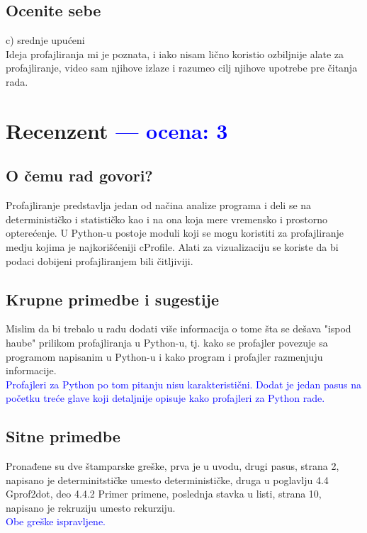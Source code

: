 \documentclass[a4paper]{report}
\newcommand{\odgovor}[1]{\textcolor{blue}{#1}}
\begin{document}
\section{Ocenite sebe}
c) srednje upućeni
\\
Ideja profajliranja mi je poznata, i iako nisam lično koristio ozbiljnije alate za profajliranje, video sam njihove izlaze i razumeo cilj njihove upotrebe pre čitanja rada.

\chapter{Recenzent \odgovor{--- ocena: 3} }


\section{O čemu rad govori?}
Profajliranje predstavlja jedan od načina analize programa i deli se na determinističko i statističko kao i na ona koja mere vremensko i prostorno opterećenje. U Python-u postoje moduli koji se mogu koristiti za profajliranje medju kojima je najkorišćeniji cProfile. Alati za vizualizaciju se koriste da bi podaci dobijeni profajliranjem bili čitljiviji.
\section{Krupne primedbe i sugestije}
Mislim da bi trebalo u radu dodati više informacija o tome šta se dešava "ispod haube" prilikom profajliranja u Python-u, tj. kako se profajler povezuje sa programom napisanim u Python-u i kako program i profajler razmenjuju informacije. \\
\odgovor{Profajleri za Python po tom pitanju nisu karakteristični. Dodat je jedan pasus  na početku treće glave koji detaljnije opisuje kako profajleri za Python rade.}

\section{Sitne primedbe}
Pronađene su dve štamparske greške, prva je u uvodu, drugi pasus, strana 2, napisano je determinitstičke umesto determinističke, druga u poglavlju 4.4 Gprof2dot, deo 4.4.2 Primer primene, poslednja stavka u listi, strana 10, napisano je rekruziju umesto rekurziju.\\
\odgovor{Obe greške ispravljene.}
\end{document}
